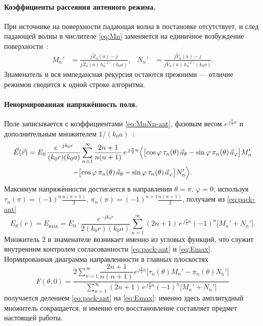 \documentclass[11pt,a4paper]{article}
\newcommand{\ao}{\vec a_\theta}
\newcommand{\af}{\vec a_\varphi}
\newcommand{\Zl}{\overleftarrow{Z}}
\newcommand{\Zb}{\overleftrightarrow{Z}}
\newcommand{\Yl}{\overleftarrow{Y}}
\newcommand{\Yb}{\overleftrightarrow{Y}}
\newcommand{\hn}{h_n^{(2)}}
\begin{document}
\paragraph{Коэффициенты рассеяния антенного режима.}
При источнике на поверхности падающая волна в постановке отсутствует, и след
падающей волны в числителе \eqref{eq:Mn} заменяется на единичное возбуждение
поверхности~\cite[ф-ла~13.4]{panchenko2013}:
%
\begin{align}
  \label{eq:MnNn-ant}
  M_n' &= \frac{j\Zl_n(a) - j}{j\Zb_n(a)\,\hn(k_0a)}, &
  N_n' &= \frac{j\Yl_n(a) - j}{j\Yb_n(a)\,\hn(k_0a)}.
\end{align}
%
Знаменатель и вся импедансная рекурсия остаются прежними --- отличие
режимов сводится к одной строке алгоритма.

\paragraph{Ненормированная напряжённость поля.}
Поле записывается с коэффициентами \eqref{eq:MnNn-ant}, фазовым весом
$e^{\,j\frac{\pi}{2}n}$ и дополнительным множителем
$1/(k_0a)$~\cite[ф-ла~13.3]{panchenko2013}:
%
\begin{multline}
  \label{eq:pack-ant}
  \vec E(\vec r) = E_0\,\frac{e^{-jk_0r}}{(k_0r)(k_0a)}
  \sum_{n=1}^{\infty}\frac{2n+1}{n(n+1)}\,e^{\,j\frac{\pi}{2}n}
  \Bigl\langle\bigl[\cos\varphi\,\tau_n(\theta)\,\ao - \sin\varphi\,\pi_n(\theta)\,\af\bigr]M_n'\\
  -\bigl[\cos\varphi\,\pi_n(\theta)\,\ao - \sin\varphi\,\tau_n(\theta)\,\af\bigr]N_n'\Bigr\rangle.
\end{multline}
%
Максимум напряжённости достигается в направлении $\theta = \pi$, $\varphi = 0$;
используя $\tau_n(\pi) = (-1)^n\frac{n(n+1)}{2}$,
$\pi_n(\pi) = (-1)^{n+1}\frac{n(n+1)}{2}$, получаем из
\eqref{eq:pack-ant}~\cite[ф-ла~13.5]{panchenko2013}
%
\begin{equation}
  \label{eq:Emax}
  E_\theta(r) = E_{\max} = E_0\cdot\frac{e^{-jk_0r}}{2(k_0r)(k_0a)}
  \sum_{n=1}^{\infty}(2n+1)\,e^{\,j\frac{\pi}{2}n}(-1)^n\bigl[M_n' + N_n'\bigr].
\end{equation}
%
Множитель $2$ в знаменателе возникает именно из угловых функций, что служит
внутренним контролем согласованности \eqref{eq:pack-ant} и \eqref{eq:Emax}.
Нормированная диаграмма направленности в главных
плоскостях~\cite[ф-ла~13.6]{panchenko2013}
%
\begin{equation}
  \label{eq:Fpat}
  F(\theta,0) = \frac{2\sum\limits_{n=1}^{\infty}\dfrac{2n+1}{n(n+1)}
    e^{\,j\frac{\pi}{2}n}\bigl[\tau_n(\theta)M_n' - \pi_n(\theta)N_n'\bigr]}
    {\sum\limits_{n=1}^{\infty}(2n+1)\,e^{\,j\frac{\pi}{2}n}(-1)^n\bigl[M_n' + N_n'\bigr]}
\end{equation}
%
получается делением \eqref{eq:pack-ant} на \eqref{eq:Emax}: именно здесь амплитудный
множитель сокращается, и именно его восстановление составляет предмет настоящей
работы.
\end{document}

